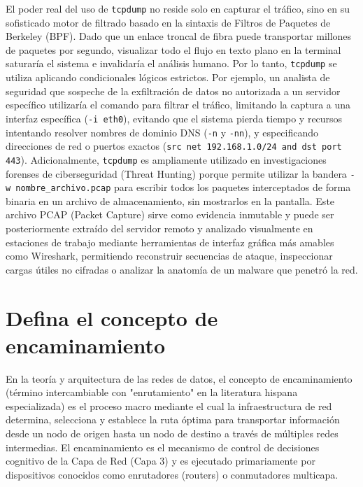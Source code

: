 \documentclass[a4paper,12pt]{article}
\begin{document}
El poder real del uso de \texttt{tcpdump} no reside solo en capturar el tráfico, sino en su sofisticado motor de filtrado basado en la sintaxis de Filtros de Paquetes de Berkeley (BPF). Dado que un enlace troncal de fibra puede transportar millones de paquetes por segundo, visualizar todo el flujo en texto plano en la terminal saturaría el sistema e invalidaría el análisis humano. Por lo tanto, \texttt{tcpdump} se utiliza aplicando condicionales lógicos estrictos. Por ejemplo, un analista de seguridad que sospeche de la exfiltración de datos no autorizada a un servidor específico utilizaría el comando para filtrar el tráfico, limitando la captura a una interfaz específica (\texttt{-i eth0}), evitando que el sistema pierda tiempo y recursos intentando resolver nombres de dominio DNS (\texttt{-n} y \texttt{-nn}), y especificando direcciones de red o puertos exactos (\texttt{src net 192.168.1.0/24 and dst port 443}). Adicionalmente, \texttt{tcpdump} es ampliamente utilizado en investigaciones forenses de ciberseguridad (Threat Hunting) porque permite utilizar la bandera \texttt{-w nombre\_archivo.pcap} para escribir todos los paquetes interceptados de forma binaria en un archivo de almacenamiento, sin mostrarlos en la pantalla. Este archivo PCAP (Packet Capture) sirve como evidencia inmutable y puede ser posteriormente extraído del servidor remoto y analizado visualmente en estaciones de trabajo mediante herramientas de interfaz gráfica más amables como Wireshark, permitiendo reconstruir secuencias de ataque, inspeccionar cargas útiles no cifradas o analizar la anatomía de un malware que penetró la red.

\section{Defina el concepto de encaminamiento}

En la teoría y arquitectura de las redes de datos, el concepto de encaminamiento (término intercambiable con "enrutamiento" en la literatura hispana especializada) es el proceso macro mediante el cual la infraestructura de red determina, selecciona y establece la ruta óptima para transportar información desde un nodo de origen hasta un nodo de destino a través de múltiples redes intermedias. El encaminamiento es el mecanismo de control de decisiones cognitivo de la Capa de Red (Capa 3) y es ejecutado primariamente por dispositivos conocidos como enrutadores (routers) o conmutadores multicapa. 
\end{document}
